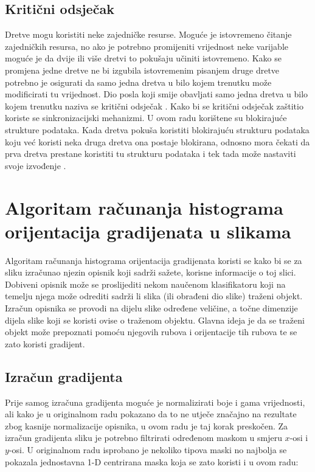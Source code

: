\documentclass[times, utf8, zavrsni]{fer}
\begin{document}
\def\UrlBreaks{\do\/\do-}

\section{Kritični odsječak}
Dretve mogu koristiti neke zajedničke resurse. Moguće je istovremeno čitanje zajedničkih resursa, no ako je potrebno promijeniti vrijednost neke varijable moguće je da dvije ili više dretvi to pokušaju učiniti istovremeno. Kako se promjena jedne dretve ne bi izgubila istovremenim pisanjem druge dretve potrebno je osigurati da samo jedna dretva u bilo kojem trenutku može modificirati tu vrijednost. Dio posla koji smije obavljati samo jedna dretva u bilo kojem trenutku naziva se kritični odsječak . Kako bi se kritični odsječak zaštitio koriste se sinkronizacijski mehanizmi. U ovom radu korištene su blokirajuće strukture podataka. Kada dretva pokuša koristiti blokirajuću strukturu podataka koju već koristi neka druga dretva ona postaje blokirana, odnosno mora čekati da prva dretva prestane koristiti tu strukturu podataka i tek tada može nastaviti svoje izvođenje \citep{os}.

\chapter{Algoritam računanja histograma orijentacija gradijenata u slikama}
Algoritam računanja histograma orijentacija gradijenata  koristi se kako bi se za sliku izračunao njezin opisnik koji sadrži sažete, korisne informacije o toj slici. Dobiveni opisnik može se proslijediti nekom naučenom klasifikatoru koji na temelju njega može odrediti sadrži li slika (ili obrađeni dio slike) traženi objekt. Izračun opisnika se provodi na dijelu slike određene veličine, a točne dimenzije dijela slike koji se koristi ovise o traženom objektu. Glavna ideja je da se traženi objekt može prepoznati pomoću njegovih rubova i orijentacije tih rubova te se zato koristi gradijent.

\section{Izračun gradijenta}
Prije samog izračuna gradijenta moguće je normalizirati boje i gama vrijednosti, ali kako je u originalnom radu \citep{dalal2005histograms} pokazano da to ne utječe značajno na rezultate zbog kasnije normalizacije opisnika, u ovom radu je taj korak preskočen. Za izračun gradijenta sliku je potrebno filtrirati određenom maskom u smjeru \(x\)-osi i \(y\)-osi. U originalnom radu \citep{dalal2005histograms} isprobano je nekoliko tipova maski no najbolja se pokazala jednostavna 1-D centrirana maska koja se zato koristi i u ovom radu: 
\end{document}
